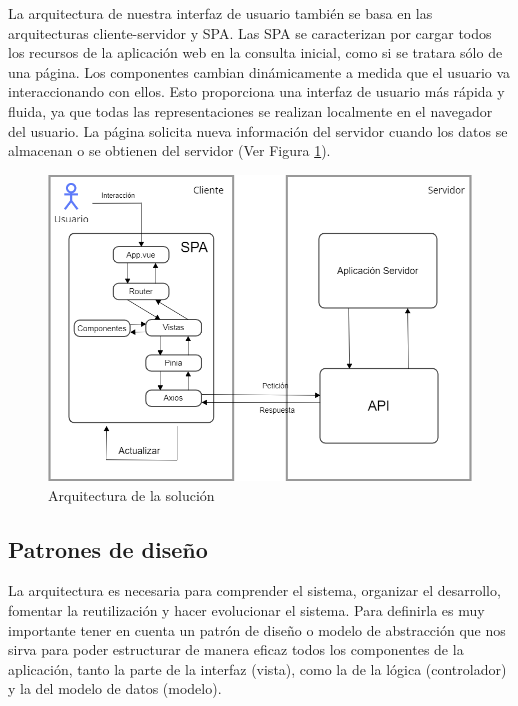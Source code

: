 La arquitectura de nuestra interfaz de usuario también se basa en las arquitecturas cliente-servidor y SPA. Las SPA se caracterizan por cargar todos los recursos de la aplicación web en la consulta inicial, como si se tratara sólo de una página. Los componentes cambian dinámicamente a medida que el usuario va interaccionando con ellos. Esto proporciona una interfaz de usuario más rápida y fluida, ya que todas las representaciones se realizan localmente en el navegador del usuario. La página solicita nueva información del servidor cuando los datos se almacenan o se obtienen del servidor (Ver Figura \ref{fig:spa}).

\begin{figure}[htbp]
\centering
\includegraphics[scale=0.4]{Graphics/mySPAtt}
\caption{Arquitectura de la solución}
\label{fig:spa}
\end{figure}

\subsection{Patrones de diseño}

La arquitectura es necesaria para comprender el sistema, organizar el desarrollo, fomentar la reutilización y hacer evolucionar el sistema. Para definirla es muy importante tener en cuenta un patrón de diseño o modelo de abstracción que nos sirva para poder estructurar de manera eficaz todos los componentes de la aplicación, tanto la parte de la interfaz (vista), como la de la lógica (controlador) y la del modelo de datos (modelo).


